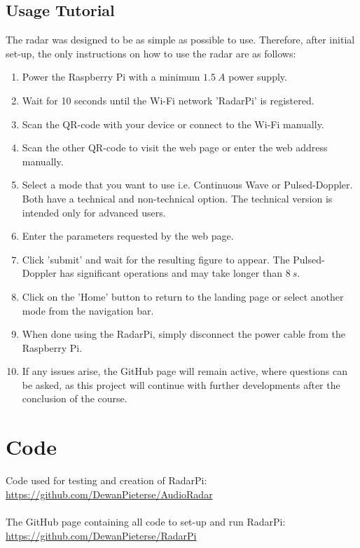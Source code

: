 \section{Usage Tutorial}
The radar was designed to be as simple as possible to use. Therefore, after initial set-up, the only instructions on how to use the radar are as follows:

\begin{enumerate}
\item Power the Raspberry Pi with a minimum $1.5\ A$ power supply.
\item Wait for 10 seconds until the Wi-Fi network 'RadarPi' is registered. 
\item Scan the QR-code with your device or connect to the Wi-Fi manually.
\item Scan the other QR-code to visit the web page or enter the web address manually.
\item Select a mode that you want to use i.e. Continuous Wave or Pulsed-Doppler. Both have a technical and non-technical option. The technical version is intended only for advanced users.
\item Enter the parameters requested by the web page.
\item Click 'submit' and wait for the resulting figure to appear. The Pulsed-Doppler has significant operations and may take longer than $8\ s$.
\item Click on the 'Home' button to return to the landing page or select another mode from the navigation bar.
\item When done using the RadarPi, simply disconnect the power cable from the Raspberry Pi.
\item If any issues arise, the GitHub page will remain active, where questions can be asked, as this project will continue with further developments after the conclusion of the course.
\end{enumerate}



\newpage

\chapter{Code}\label{Appendix:Code}

Code used for testing and creation of RadarPi: \url{https://github.com/DewanPieterse/AudioRadar}\\ \\
The GitHub page containing all code to set-up and run RadarPi: \url{https://github.com/DewanPieterse/RadarPi}\\ \\


